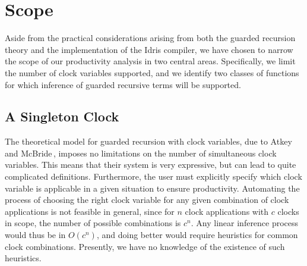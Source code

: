 


\section{Scope}
Aside from the practical considerations arising from both the guarded recursion
theory and the implementation of the Idris compiler, we have chosen to narrow the
scope of our productivity analysis in two central areas. Specifically, we limit
the number of clock variables supported, and we identify two classes of
functions for which inference of guarded recursive terms will be supported.

\subsection{A Singleton Clock}
\label{sec:singleton-clock}

The theoretical model for guarded recursion with clock variables, due to Atkey
and McBride\,\citep{Atkey:2013}, imposes no limitations on the number of
simultaneous clock variables. This means that their system is very
expressive, but can lead to quite complicated definitions. Furthermore, the user must
explicitly specify which clock variable is applicable in a given situation to ensure
productivity. Automating the process of choosing the right clock variable for
any given combination of clock applications is not feasible in general, since for $n$ clock applications with $c$
clocks in scope, the number of possible combinations is $c^n$. Any linear
inference process would thus be in $O(c^n)$, and doing better would require
heuristics for common clock combinations. Presently, we have no knowledge of the
existence of such heuristics.

